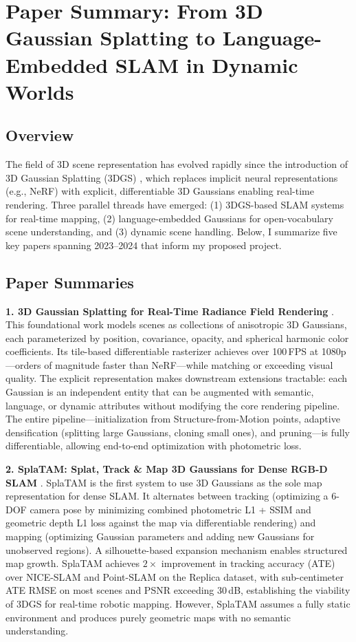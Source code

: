 \documentclass[10pt,twocolumn,letterpaper]{article}
\begin{document}
\section{Paper Summary: From 3D Gaussian Splatting to Language-Embedded SLAM in Dynamic Worlds}

\subsection{Overview}

The field of 3D scene representation has evolved rapidly since the introduction of 3D Gaussian Splatting (3DGS) \cite{kerbl20233dgs}, which replaces implicit neural representations (e.g., NeRF) with explicit, differentiable 3D Gaussians enabling real-time rendering. Three parallel threads have emerged: (1) 3DGS-based SLAM systems for real-time mapping, (2) language-embedded Gaussians for open-vocabulary scene understanding, and (3) dynamic scene handling. Below, I summarize five key papers spanning 2023--2024 that inform my proposed project.

\subsection{Paper Summaries}

\textbf{1. 3D Gaussian Splatting for Real-Time Radiance Field Rendering} \cite{kerbl20233dgs}. This foundational work models scenes as collections of anisotropic 3D Gaussians, each parameterized by position, covariance, opacity, and spherical harmonic color coefficients. Its tile-based differentiable rasterizer achieves over 100\,FPS at 1080p---orders of magnitude faster than NeRF---while matching or exceeding visual quality. The explicit representation makes downstream extensions tractable: each Gaussian is an independent entity that can be augmented with semantic, language, or dynamic attributes without modifying the core rendering pipeline. The entire pipeline---initialization from Structure-from-Motion points, adaptive densification (splitting large Gaussians, cloning small ones), and pruning---is fully differentiable, allowing end-to-end optimization with photometric loss.

\textbf{2. SplaTAM: Splat, Track \& Map 3D Gaussians for Dense RGB-D SLAM} \cite{keetha2024splatam}. SplaTAM is the first system to use 3D Gaussians as the sole map representation for dense SLAM. It alternates between tracking (optimizing a 6-DOF camera pose by minimizing combined photometric L1 + SSIM and geometric depth L1 loss against the map via differentiable rendering) and mapping (optimizing Gaussian parameters and adding new Gaussians for unobserved regions). A silhouette-based expansion mechanism enables structured map growth. SplaTAM achieves $2\times$ improvement in tracking accuracy (ATE) over NICE-SLAM and Point-SLAM on the Replica dataset, with sub-centimeter ATE RMSE on most scenes and PSNR exceeding 30\,dB, establishing the viability of 3DGS for real-time robotic mapping. However, SplaTAM assumes a fully static environment and produces purely geometric maps with no semantic understanding.
\end{document}
